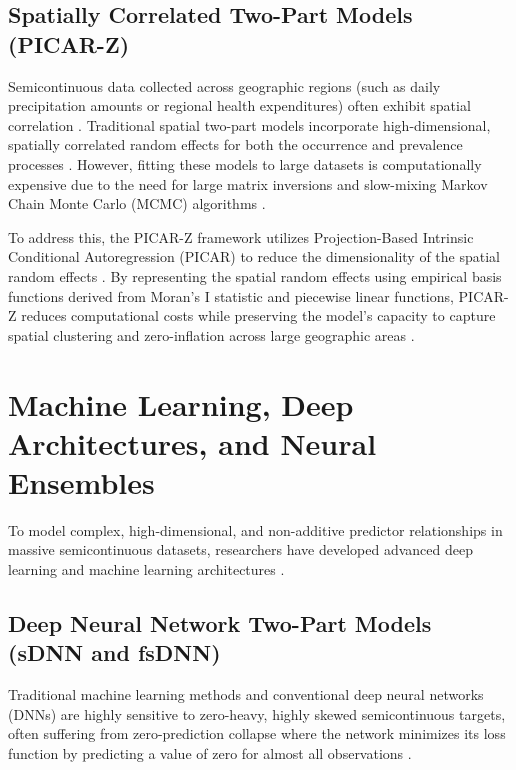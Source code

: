 \subsection{Spatially Correlated Two-Part Models (PICAR-Z)}

Semicontinuous data collected across geographic regions (such as daily precipitation amounts or regional health expenditures) often exhibit spatial correlation \cite{neelon2019, neelon2014}. Traditional spatial two-part models incorporate high-dimensional, spatially correlated random effects for both the occurrence and prevalence processes \cite{neelon2014}. However, fitting these models to large datasets is computationally expensive due to the need for large matrix inversions and slow-mixing Markov Chain Monte Carlo (MCMC) algorithms \cite{neelon2014}.

To address this, the PICAR-Z framework utilizes Projection-Based Intrinsic Conditional Autoregression (PICAR) to reduce the dimensionality of the spatial random effects \cite{neelon2014}. By representing the spatial random effects using empirical basis functions derived from Moran's I statistic and piecewise linear functions, PICAR-Z reduces computational costs while preserving the model's capacity to capture spatial clustering and zero-inflation across large geographic areas \cite{neelon2014}.

\section{Machine Learning, Deep Architectures, and Neural Ensembles}

To model complex, high-dimensional, and non-additive predictor relationships in massive semicontinuous datasets, researchers have developed advanced deep learning and machine learning architectures \cite{zou2025sdnn, zou2025fsdnn}.

\subsection{Deep Neural Network Two-Part Models (sDNN and fsDNN)}

Traditional machine learning methods and conventional deep neural networks (DNNs) are highly sensitive to zero-heavy, highly skewed semicontinuous targets, often suffering from zero-prediction collapse where the network minimizes its loss function by predicting a value of zero for almost all observations \cite{zou2025sdnn, wzslstm2024}. 

